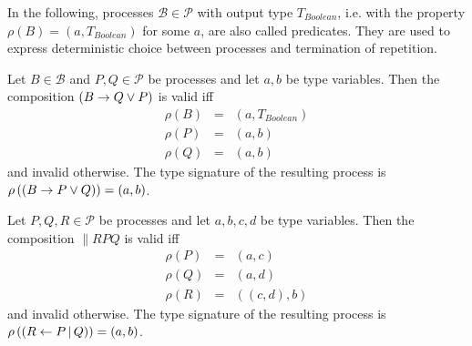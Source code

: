 
In the following, processes $\mathcal{B} \in \mathcal{P}$ with output type $T_{Boolean}$, i.e. with the property $\rho \left( B \right) = \left( a, T_{Boolean} \right)$ for some $a$, are also called predicates. They are used to express deterministic choice between processes and termination of repetition.

\begin{definition}
\label{def:static_choice}
Let $B \in \mathcal{B}$ and $P, Q \in \mathcal{P}$ be processes and let $a, b$ be type variables. Then the composition $\left( B \to Q \vee P \right)$ is valid iff
\begin{eqnarray*}
  \rho \left( B \right) & = & \left( a, T_{Boolean} \right) \\
  \rho \left( P \right) & = & \left( a, b \right) \\
  \rho \left( Q \right) & = & \left( a, b \right)
\end{eqnarray*}
and invalid otherwise. The type signature of the resulting process is $\rho \left( \left( B \to P \vee Q \right) \right) = \left( a, b \right)$.

\hfill\qedsymbol
\end{definition}


\begin{definition}
\label{def:static_parallel}
Let $P, Q, R \in \mathcal{P}$ be processes and let $a, b, c, d$ be type variables. Then the composition $\parallel{R}{P}{Q}$ is valid iff
\begin{eqnarray*}
  \rho \left( P \right) & = & \left( a, c \right) \\
  \rho \left( Q \right) & = & \left( a, d \right) \\
  \rho \left( R \right) & = & \left( \left( c, d \right), b \right)
\end{eqnarray*}
and invalid otherwise. The type signature of the resulting process is $\rho \left( \left( R \gets P \, | \, Q \right) \right) = \left( a, b \right)$.

\hfill\qedsymbol
\end{definition}



